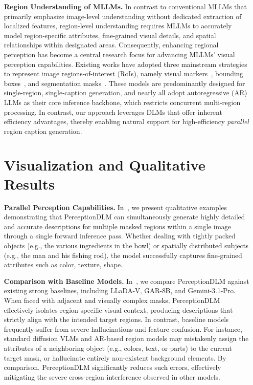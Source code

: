\documentclass{llmxive}
\begin{document}
\noindent
\textbf{Region Understanding of MLLMs.}
In contrast to conventional MLLMs that primarily emphasize image-level understanding without dedicated extraction of localized features, region-level understanding requires MLLMs to accurately model region-specific attributes, fine-grained visual details, and spatial relationships within designated areas. 
%
Consequently, enhancing regional perception has become a central research focus for advancing MLLMs' visual perception capabilities.
%
Existing works have adopted three mainstream strategies to represent image regions-of-interest (RoIs), namely visual markers~\citep{yang2023set}, bounding boxes~\citep{zhang2307gpt4roi, chen2023shikra, rasheed2024glamm}, and segmentation masks~\citep{zhang2024omg,yuan2025sa2va, zhang2025pixel,yuan2025visual,wang2025grasp, zhou2026samtok, lian2025describe}.
%
These models are predominantly designed for single-region, single-caption generation, and nearly all adopt autoregressive (AR) LLMs as their core inference backbone, which restricts concurrent multi-region processing.
%
In contrast, our approach leverages DLMs that offer inherent efficiency advantages, thereby enabling natural support for high-efficiency \textit{parallel} region caption generation.
\label{sec:related_works}


\section{Visualization and Qualitative Results}
\label{sec:qua}

\noindent
\textbf{Parallel Perception Capabilities.} 
In~, we present qualitative examples demonstrating that PerceptionDLM can simultaneously generate highly detailed and accurate descriptions for multiple masked regions within a single image through a single forward inference pass. Whether dealing with tightly packed objects (e.g., the various ingredients in the bowl) or spatially distributed subjects (e.g., the man and his fishing rod), the model successfully captures fine-grained attributes such as color, texture, shape.

\noindent
\textbf{Comparison with Baseline Models.} 
In~, we compare PerceptionDLM against existing strong baselines, including LLaDA-V, GAR-8B, and Gemini-3.1-Pro. When faced with adjacent and visually complex masks, PerceptionDLM effectively isolates region-specific visual context, producing descriptions that strictly align with the intended target regions. In contrast, baseline models frequently suffer from severe hallucinations and feature confusion. For instance, standard diffusion VLMs and AR-based region models may mistakenly assign the attributes of a neighboring object (e.g., colors, text, or parts) to the current target mask, or hallucinate entirely non-existent background elements. By comparison, PerceptionDLM significantly reduces such errors, effectively mitigating the severe cross-region interference observed in other models.
\end{document}
